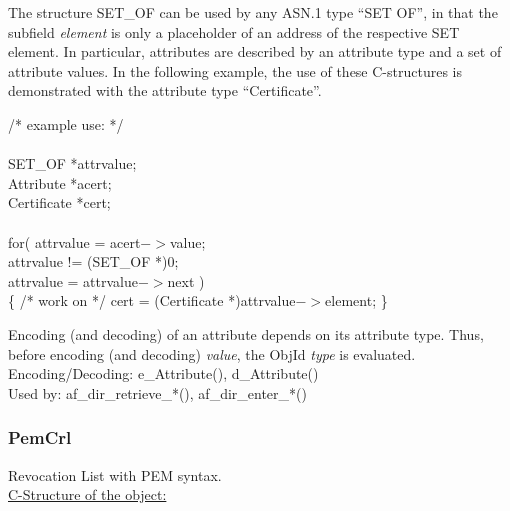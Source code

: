 The structure SET\_OF can be used by any ASN.1 type ``SET OF'',
in that the subfield {\em *element} is only a placeholder
of an address of the respective SET element.
In particular, attributes are described by an attribute type
and a set of attribute values. In the following example,
the use of these C-structures is demonstrated with
the attribute type ``Certificate''.

{\small
\btab
\1 /* example use: */   \\ \\
\2      SET\_OF     \2   *attrvalue; \\
\2      Attribute   \2   *acert;     \\
\2      Certificate \2   *cert;      \\ \\
\2      for( attrvalue = acert$->$value;  \\
\3         attrvalue != (SET\_OF *)0;  \\
\3         attrvalue = attrvalue$->$next ) \\
\2         \{ /* work on */ cert = (Certificate *)attrvalue$->$element; \} \\
\etab
}

Encoding (and decoding) of an attribute depends on its attribute type.
Thus, before encoding (and decoding) {\em value},
the ObjId {\em type} is evaluated.
\\
Encoding/Decoding: e\_Attribute(), d\_Attribute() \\
Used by: af\_dir\_retrieve\_*(), af\_dir\_enter\_*()

\subsubsection{PemCrl}
Revocation List with PEM syntax. \\
\underline{C-Structure of the object:}

